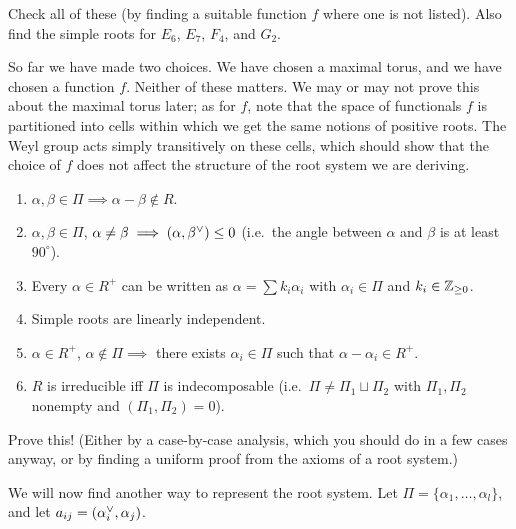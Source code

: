 \begin{exercise}
Check all of these (by finding a suitable function $f$ where one is not
listed). Also find the simple roots for $E_6$, $E_7$, $F_4$, and $G_2$.
\end{exercise}

\begin{remark}
So far we have made two choices. We have chosen a maximal torus, and we have
chosen a function $f$. Neither of these matters. We may or may not prove this
about the maximal torus later; as for $f$, note that the space of functionals
$f$ is partitioned into cells within which we get the same notions of positive
roots. The Weyl group acts simply transitively on these cells, which should
show that the choice of $f$ does not affect the structure of the root system we
are deriving.
\end{remark}

\begin{proposition}\leavevmode
\begin{enumerate}
  \item $\alpha, \beta \in \Pi \implies \alpha - \beta \notin R$.
  \item $\alpha, \beta \in \Pi$, $\alpha \neq \beta \implies (\alpha, \beta^{\vee}) \leq 0$
    (i.e.\ the angle between $\alpha$ and $\beta$ is at least $90^\circ$).
  \item Every $\alpha \in R^+$ can be written as $\alpha = \sum k_i\alpha_i$
    with $\alpha_i \in \Pi$ and $k_i \in \mathbb{Z}_{\geq 0}$.
  \item Simple roots are linearly independent.
  \item $\alpha \in R^+$, $\alpha \notin \Pi \implies$ there exists
    $\alpha_i \in \Pi$ such that $\alpha - \alpha_i \in R^+$.
  \item $R$ is irreducible iff $\Pi$ is indecomposable (i.e.\
    $\Pi \neq \Pi_1 \sqcup \Pi_2$ with $\Pi_1, \Pi_2$ nonempty and
    $(\Pi_1, \Pi_2) = 0$).
\end{enumerate}
\end{proposition}

\begin{exercise}
Prove this! (Either by a case-by-case analysis, which you should do in a few
cases anyway, or by finding a uniform proof from the axioms of a root system.)
\end{exercise}

We will now find another way to represent the root system. Let
$\Pi = \{\alpha_1, \dots, \alpha_l\}$, and let $a_{ij} = (\alpha_i^{\vee}, \alpha_j)$.

